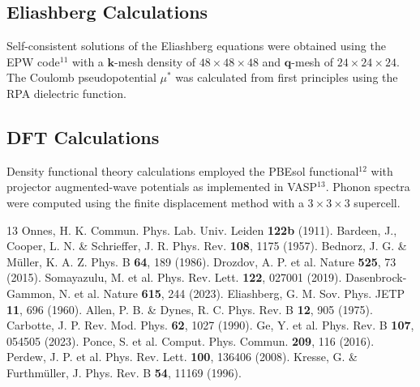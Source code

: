 \documentclass[letter,naturemag]{nature}
\begin{document}
\begin{methods}
\subsection{Eliashberg Calculations}
Self-consistent solutions of the Eliashberg equations were obtained using the EPW code$^{11}$ with a $\mathbf{k}$-mesh density of $48\times48\times48$ and $\mathbf{q}$-mesh of $24\times24\times24$. The Coulomb pseudopotential $\mu^*$ was calculated from first principles using the RPA dielectric function.

\subsection{DFT Calculations}
Density functional theory calculations employed the PBEsol functional$^{12}$ with projector augmented-wave potentials as implemented in VASP$^{13}$. Phonon spectra were computed using the finite displacement method with a $3\times3\times3$ supercell.
\end{methods}

\begin{thebibliography}{13}
 Onnes, H. K. Commun. Phys. Lab. Univ. Leiden \textbf{122b} (1911).
 Bardeen, J., Cooper, L. N. \& Schrieffer, J. R. Phys. Rev. \textbf{108}, 1175 (1957).
 Bednorz, J. G. \& M\"uller, K. A. Z. Phys. B \textbf{64}, 189 (1986).
 Drozdov, A. P. et al. Nature \textbf{525}, 73 (2015).
 Somayazulu, M. et al. Phys. Rev. Lett. \textbf{122}, 027001 (2019).
 Dasenbrock-Gammon, N. et al. Nature \textbf{615}, 244 (2023).
 Eliashberg, G. M. Sov. Phys. JETP \textbf{11}, 696 (1960).
 Allen, P. B. \& Dynes, R. C. Phys. Rev. B \textbf{12}, 905 (1975).
 Carbotte, J. P. Rev. Mod. Phys. \textbf{62}, 1027 (1990).
 Ge, Y. et al. Phys. Rev. B \textbf{107}, 054505 (2023).
 Ponce, S. et al. Comput. Phys. Commun. \textbf{209}, 116 (2016).
 Perdew, J. P. et al. Phys. Rev. Lett. \textbf{100}, 136406 (2008).
 Kresse, G. \& Furthm\"uller, J. Phys. Rev. B \textbf{54}, 11169 (1996).
\end{thebibliography}
\end{document}

